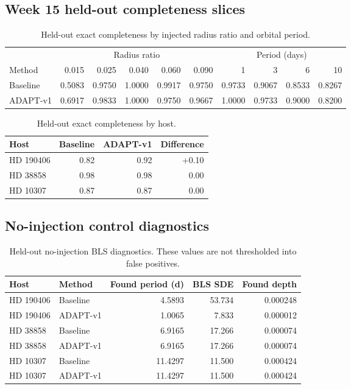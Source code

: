 \documentclass[11pt]{article}
\begin{document}
\subsection{Week 15 held-out completeness slices}
\begin{table}[htbp]
\centering
\caption{Held-out exact completeness by injected radius ratio and orbital period.}
\small
\begin{tabular}{lrrrrrrrrr}
\toprule
& \multicolumn{5}{c}{Radius ratio} & \multicolumn{4}{c}{Period (days)}\\
\cmidrule(lr){2-6}\cmidrule(lr){7-10}
Method & 0.015 & 0.025 & 0.040 & 0.060 & 0.090 & 1 & 3 & 6 & 10\\
\midrule
Baseline & 0.5083 & 0.9750 & 1.0000 & 0.9917 & 0.9750 & 0.9733 & 0.9067 & 0.8533 & 0.8267\\
ADAPT-v1 & 0.6917 & 0.9833 & 1.0000 & 0.9750 & 0.9667 & 1.0000 & 0.9733 & 0.9000 & 0.8200\\
\bottomrule
\end{tabular}
\end{table}

\begin{table}[htbp]
\centering
\caption{Held-out exact completeness by host.}
\small
\begin{tabular}{lrrr}
\toprule
Host & Baseline & ADAPT-v1 & Difference\\
\midrule
HD 190406 & 0.82 & 0.92 & +0.10\\
HD 38858  & 0.98 & 0.98 & 0.00\\
HD 10307  & 0.87 & 0.87 & 0.00\\
\bottomrule
\end{tabular}
\end{table}

\subsection{No-injection control diagnostics}
\begin{table}[htbp]
\centering
\caption{Held-out no-injection BLS diagnostics. These values are not thresholded into false positives.}
\small
\begin{tabular}{llrrr}
\toprule
Host & Method & Found period (d) & BLS SDE & Found depth\\
\midrule
HD 190406 & Baseline & 4.5893 & 53.734 & 0.000248\\
HD 190406 & ADAPT-v1 & 1.0065 & 7.833 & 0.000012\\
HD 38858  & Baseline & 6.9165 & 17.266 & 0.000074\\
HD 38858  & ADAPT-v1 & 6.9165 & 17.266 & 0.000074\\
HD 10307  & Baseline & 11.4297 & 11.500 & 0.000424\\
HD 10307  & ADAPT-v1 & 11.4297 & 11.500 & 0.000424\\
\bottomrule
\end{tabular}
\end{table}
\end{document}
